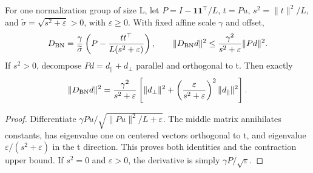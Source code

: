 \begin{proposition}
\label{prop:astra_bn_derivative}
For one normalization group of size L, let
$P=I-\boldsymbol1\boldsymbol1^\top/L$, $t=Pu$,
$s^2=\|t\|^2/L$, and $\widetilde\sigma=\sqrt{s^2+\varepsilon}>0$,
with $\varepsilon\ge0$. With fixed affine scale $\gamma$ and offset,
\begin{equation}\label{eq:astra_bn_derivative}
 D_{\rm BN}=\frac{\gamma}{\widetilde\sigma}
 \left(P-\frac{tt^\top}{L(s^2+\varepsilon)}\right),\qquad
 \|D_{\rm BN}d\|^2\le\frac{\gamma^2}{s^2+\varepsilon}\|Pd\|^2.
\end{equation}
If $s^2>0$, decompose $Pd=d_\parallel+d_\perp$ parallel and orthogonal
to t. Then exactly
\[
 \|D_{\rm BN}d\|^2=\frac{\gamma^2}{s^2+\varepsilon}
 \left[\|d_\perp\|^2+
 \left(\frac{\varepsilon}{s^2+\varepsilon}\right)^2\|d_\parallel\|^2\right].
\]
\end{proposition}
\begin{proof}
Differentiate $\gamma Pu/\sqrt{\|Pu\|^2/L+\varepsilon}$.
The middle matrix annihilates constants, has eigenvalue one on
centered vectors orthogonal to t, and eigenvalue
$\varepsilon/(s^2+\varepsilon)$ in the t direction. This proves both
identities and the contraction upper bound. If $s^2=0$ and
$\varepsilon>0$, the derivative is simply $\gamma P/\sqrt\varepsilon$.
\end{proof}

